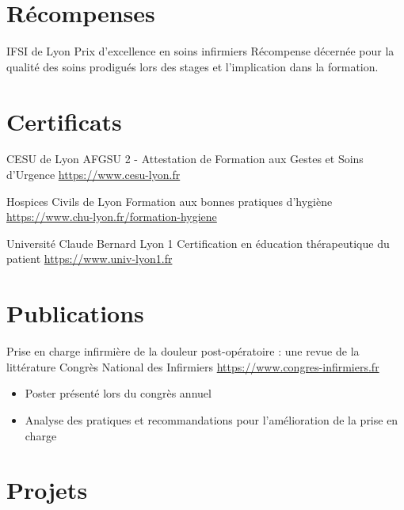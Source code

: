 \documentclass[a4paper, serif, 10pt]{moderncv}
\begin{document}
\section{Récompenses}

        {IFSI de Lyon}
        {Prix d'excellence en soins infirmiers}
        {}
        {}
        {Récompense décernée pour la qualité des soins prodigués lors des stages et l'implication dans la formation.}
\section{Certificats}

        {CESU de Lyon}
        {AFGSU 2 - Attestation de Formation aux Gestes et Soins d'Urgence}
        {\url{https://www.cesu-lyon.fr}}
        {}
        {}

        {Hospices Civils de Lyon}
        {Formation aux bonnes pratiques d'hygiène}
        {\url{https://www.chu-lyon.fr/formation-hygiene}}
        {}
        {}

        {Université Claude Bernard Lyon 1}
        {Certification en éducation thérapeutique du patient}
        {\url{https://www.univ-lyon1.fr}}
        {}
        {}
\section{Publications}

        {Prise en charge infirmière de la douleur post-opératoire : une revue de la littérature}
        {Congrès National des Infirmiers}
        {\url{https://www.congres-infirmiers.fr}}
        {}
        {\begin{itemize}
\item Poster présenté lors du congrès annuel
\item Analyse des pratiques et recommandations pour l'amélioration de la prise en charge
\end{itemize}}
\section{Projets}
\end{document}
